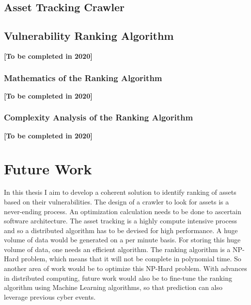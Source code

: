 \subsection{Asset Tracking Crawler}\label{sec:algo_crawl}

\subsection{Vulnerability Ranking Algorithm}\label{sec:algo_vul}
\textbf{[To be completed in 2020]}
\subsubsection{Mathematics of the Ranking Algorithm}\label{sec:vul_math}
\textbf{[To be completed in 2020]}
\subsubsection{Complexity Analysis of the Ranking Algorithm}\label{sec:vul_complex}
\textbf{[To be completed in 2020]}

\section{Future Work}\label{sec:future_work}
In this thesis I aim to develop a coherent solution to identify ranking of assets based on their vulnerabilities. The design of a crawler to look for assets is a never-ending process. An optimization calculation needs to be done to ascertain software architecture. The asset tracking is a highly compute intensive process and so a distributed algorithm has to be devised for high performance. A huge volume of data would be generated on a per minute basis. For storing this huge volume of data, one needs an efficient algorithm. The ranking algorithm is a NP-Hard problem, which means that it will not be complete in polynomial time. So another area of work would be to optimize this NP-Hard problem. With advances in distributed computing, future work would also be to fine-tune the ranking algorithm using Machine Learning algorithms, so that prediction can also leverage previous cyber events.

